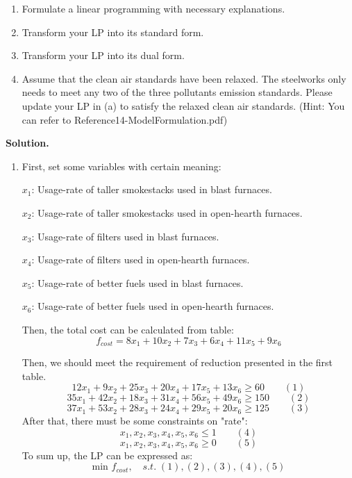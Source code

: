 \documentclass[12pt,a4paper]{article}
\theoremstyle{definition}
\begin{document}
\begin{enumerate}
\begin{table}[h]
    \end{table}
     
    
    \begin{enumerate}
    	\item Formulate a linear programming with necessary explanations.
    	\item
    	Transform your LP into its standard form.
    	\item
    	Transform your LP into its dual form.
    	\item 
    	Assume that the clean air standards have been relaxed. The steelworks only needs to meet any two of the three pollutants emission standards. Please update your LP in (a) to satisfy the relaxed clean air standards. {\color{blue}(Hint: You can refer to Reference14-ModelFormulation.pdf)}
    	
    \end{enumerate}
     
   \textbf{ Solution.}
    \begin{enumerate}
    	\item First, set some variables with certain meaning:
    	
    	$x_1$: Usage-rate of taller smokestacks used in blast furnaces.
    	
    	$x_2$: Usage-rate of taller smokestacks used in open-hearth furnaces.
    	
    	$x_3$: Usage-rate of filters used in blast furnaces.
    	
    	$x_4$: Usage-rate of filters used in open-hearth furnaces.
    	
    	$x_5$: Usage-rate of better fuels  used in blast furnaces.
    	
    	$x_6$: Usage-rate of better fuels  used in open-hearth furnaces.
    	
    	Then, the total cost can be calculated from table:
    	$$f_{cost}=8x_1+10x_2+7x_3+6x_4+11x_5+9x_6$$ 
    	
    	Then, we should meet the requirement of reduction presented in the first table.
    	$$12x_1+9x_2+25x_3+20x_4+17x_5+13x_6\geq60 \qquad(1) $$
    	$$35x_1+42x_2+18x_3+31x_4+56x_5+49x_6\geq 150\qquad(2) $$
    	$$37x_1+53x_2+28x_3+24x_4+29x_5+20x_6\geq125\qquad(3)$$
    	After that, there must be some constraints on "rate":
    	$$x_1,x_2,x_3,x_4,x_5,x_6\leq1 \qquad(4)$$
    	$$x_1,x_2,x_3,x_4,x_5,x_6\geq 0 \qquad(5) $$ 
      	To sum up, the LP can be expressed as:
      	$$\text{min } f_{cost}, \quad s.t.\; (1),(2),(3),(4),(5)$$
    	

\end{enumerate}
\end{enumerate}
\end{document}
